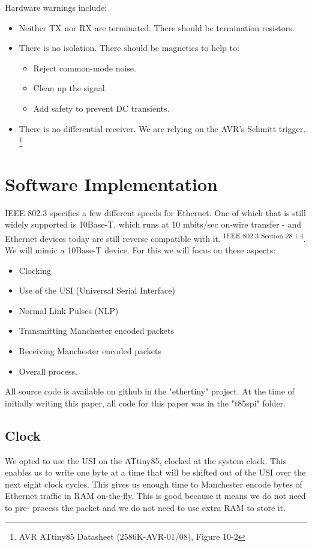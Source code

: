 \documentclass[13pt]{ltxdoc}
\begin{document}
Hardware warnings include:
\begin{itemize}
\item Neither TX nor RX are terminated.  There should be termination resistors.
\item There is no isolation.  There should be magnetics to help to:
\begin{itemize}
\item Reject common-mode noise.
\item Clean up the signal.
\item Add safety to prevent DC transients.
\end{itemize}
\item There is no differential receiver. We are relying on the AVR's Schmitt trigger. \footnote{AVR ATtiny85 Datasheet (2586K-AVR-01/08), Figure 10-2}
\end{itemize}

\section{Software Implementation}
IEEE 802.3 specifies a few different speeds for Ethernet.  One of which that is still
widely supported is 10Base-T, which runs at 10 mbits/sec on-wire transfer - and Ethernet
devices today are still reverse compatible with it.
\textsuperscript{IEEE 802.3 Section 28.1.4}.  We will
mimic a 10Base-T device.  For this we will focus on these aspects:

\begin{itemize}
\item Clocking
\item Use of the USI (Universal Serial Interface)
\item Normal Link Pulses (NLP)
\item Transmitting Manchester encoded packets
\item Receiving Manchester encoded packets
\item Overall process.
\end{itemize}

All source code is available on github in the "ethertiny" project.  At the time
of initially writing this paper, all code for this paper was in the "t85spi" folder.

\subsection{Clock}
We opted to
use the USI on the ATtiny85, clocked at the system clock.  This enables us to
write one byte at a time that will be shifted out of the USI over the next eight
clock cycles.  This gives us enough time to Manchester encode bytes of Ethernet
traffic in RAM on-the-fly.  This is good because it means we do not need to pre-
process the packet and we do not need to use extra RAM to store it.
\end{document}
